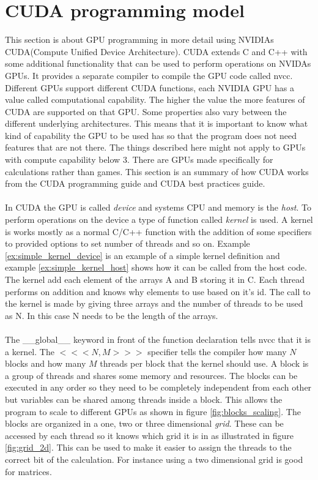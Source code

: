 \documentclass[10pt,a4paper]{report}
\begin{document}
\section{CUDA programming model}
\label{cuda_programming_model}
This section is about GPU programming in more detail using NVIDIAs CUDA(Compute Unified Device Architecture)\cite{cuda}. CUDA extends C and C++ with some additional functionality that can be used to perform operations on NVIDAs GPUs. It provides a separate compiler to compile the GPU code called nvcc\cite{cuda}. Different GPUs support different CUDA functions, each NVIDIA GPU has a value called computational capability. The higher the value the more features of CUDA are supported on that GPU. Some properties also vary between the different underlying architectures. This means that it is important to know what kind of capability the GPU to be used has so that the program does not need features that are not there. The things described here might not apply to GPUs with compute capability below 3. There are GPUs made specifically for calculations rather than games. This section is an summary of how CUDA works from the CUDA programming guide\cite{cuda} and CUDA best practices guide\cite{cuda_best_practice}.\\
\\
In CUDA the GPU is called \emph{device} and systems CPU and memory is the \emph{host}. To perform operations on the device a type of function called \emph{kernel} is used. A kernel is works mostly as a normal C/C++ function with the addition of some specifiers to provided options to set number of threads and so on. Example \ref{ex:simple_kernel_device} is an example of a simple kernel definition and example \ref{ex:simple_kernel_host} shows how it can be called from the host code. The kernel add each element of the arrays A and B storing it in C. Each thread performs on addition and knows why elements to use based on it's id. The call to the kernel is made by giving three arrays and the number of threads to be used as N. In this case N needs to be the length of the arrays.\\
\\
The \_\_global\_\_ keyword in front of the function declaration tells nvcc that it is a kernel. The $<<<N,M>>>$ specifier tells the compiler how many $N$ blocks and how many $M$ threads per block that the kernel should use\cite{cuda}. A block is a group of threads and shares some memory and resources. The blocks can be executed in any order so they need to be completely independent from each other but variables can be shared among threads inside a block\cite{cuda}. This allows the program to scale to different GPUs as shown in figure \ref{fig:blocks_scaling}. The blocks are  organized in a one, two or three dimensional \emph{grid}. These can be accessed by each thread so it knows which grid it is in as illustrated in figure \ref{fig:grid_2d}. This can be used to make it easier to assign the threads to the correct bit of the calculation. For instance using a two dimensional grid is good for matrices\cite{cuda, cuda_best_practice}.
\end{document}
